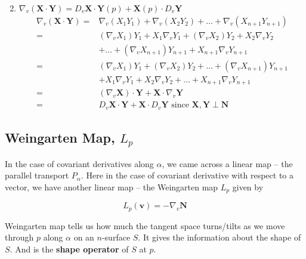 \begin{enumerate}
\begin{align*}
	\end{align*}
	\item $\nabla_v (\mathbf{X} \cdot \mathbf{Y}) = D_v \mathbf{X} \cdot \mathbf{Y}(p) + \mathbf{X}(p) \cdot D_v \mathbf{Y} $
	\begin{align*}
		\nabla_v(\mathbf{X} \cdot \mathbf{Y}) = & \nabla_v (X_1Y_1) + \nabla_v (X_2Y_2) + \dots + \nabla_v (X_{n+1}Y_{n+1}) \\
		= & (\nabla_v X_1)Y_1 + X_1\nabla_v Y_1 + (\nabla_v X_2)Y_2 + X_2\nabla_v Y_2 \\ 
		& + \dots + (\nabla_v X_{n+1})Y_{n+1} + X_{n+1}\nabla_v Y_{n+1} \\
		= & (\nabla_v X_1)Y_1 + (\nabla_v X_2)Y_2+ \dots + (\nabla_v X_{n+1})Y_{n+1} \\
		& + X_1\nabla_v Y_1 + X_2 \nabla_v Y_2 + \dots + X_{n+1} \nabla_v Y_{n+1} \\
		= &  (\nabla_v \mathbf{X}) \cdot \mathbf{Y} + \mathbf{X} \cdot \nabla_v \mathbf{Y} \\
		= & D_v \mathbf{X} \cdot \mathbf{Y} + \mathbf{X} \cdot D_v \mathbf{Y} \text{ since } \mathbf{X},\mathbf{Y} \perp \mathbf{N}
	\end{align*}
\end{enumerate}

\subsection{Weingarten Map, $L_p$}
	In the case of covariant derivatives along $\alpha$, we came across a linear map -- the parallel transport $P_\alpha$. Here in the case of covariant derivative with respect to a vector, we have another linear map -- the  Weingarten map $L_p$ given by

\begin{equation}
	L_p(\mathbf{v}) = -\nabla_v \mathbf{N}
\end{equation}
	
	Weingarten map tells us how much the tangent space turns/tilts as we move through $p$ along $\alpha$ on an $n$-surface $S$. It gives the information about the shape of $S$. And is the \textbf{shape operator} of $S$ at $p$.


